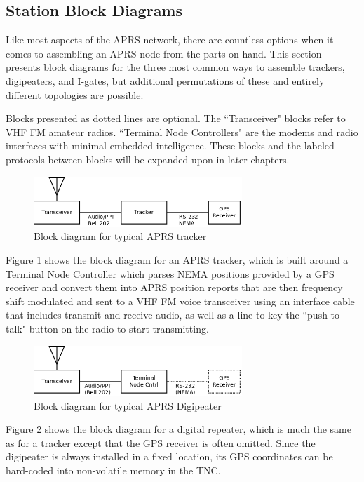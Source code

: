 \subsection{Station Block Diagrams}

Like most aspects of the APRS network, there are countless options 
when it comes to assembling an APRS node from the parts on-hand.
This section presents block diagrams for the three most common ways
to assemble trackers, digipeaters, and I-gates, but additional permutations
of these and entirely different topologies are possible.

Blocks presented as dotted lines are optional. The ``Transceiver" blocks refer to 
VHF FM amateur radios. ``Terminal Node Controllers" are the modems and radio
interfaces with minimal embedded intelligence. These blocks and the labeled protocols
between blocks will be expanded upon in later chapters.

\begin{figure}
	\centering
	\includegraphics[width=0.7\textwidth]{src/dia/tracker}
	\caption{Block diagram for typical APRS tracker}
	\label{fig:blocktracker}
\end{figure}

Figure \ref{fig:blocktracker} shows the block diagram for an APRS tracker, 
which is built around a Terminal Node Controller which parses NEMA positions
provided by a GPS receiver and convert them into APRS position reports that
are then frequency shift modulated and sent to a VHF FM voice transceiver using an
interface cable that includes transmit and receive audio, as well as a line to
key the ``push to talk" button on the radio to start transmitting.

\begin{figure}
	\centering
	\includegraphics[width=0.7\textwidth]{src/dia/tnc_digi}
	\caption{Block diagram for typical APRS Digipeater}
	\label{fig:blockdigi}
\end{figure}

Figure \ref{fig:blockdigi} shows the block diagram for a digital repeater, which
is much the same as for a tracker except that the GPS receiver is often omitted. 
Since the digipeater is always installed in a fixed location, its GPS coordinates
can be hard-coded into non-volatile memory in the TNC.

